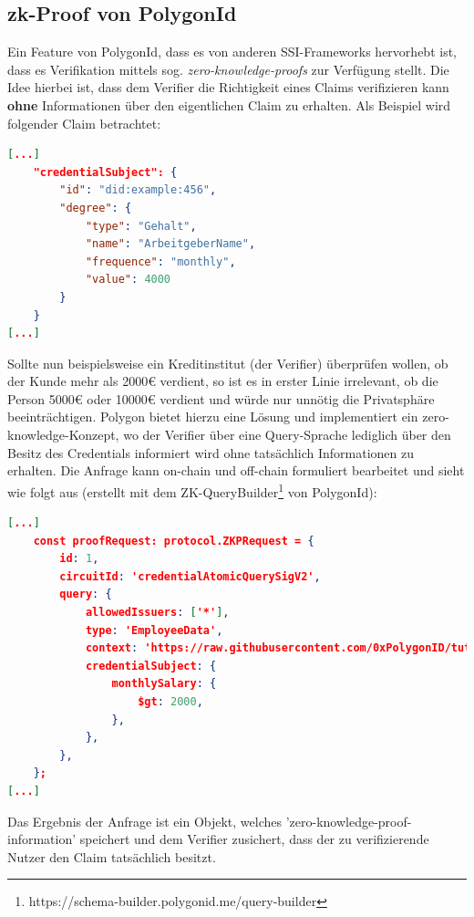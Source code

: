 \subsection{zk-Proof von PolygonId}
Ein Feature von PolygonId, dass es von anderen SSI-Frameworks hervorhebt ist, dass es Verifikation mittels sog. \textsl{zero-knowledge-proofs} zur Verfügung stellt. Die Idee hierbei ist, dass dem Verifier die Richtigkeit eines Claims verifizieren kann \textbf{ohne} Informationen über den eigentlichen Claim zu erhalten. Als Beispiel wird folgender Claim betrachtet:
\begin{lstlisting}[language=json,firstnumber=1]	
[...]
	"credentialSubject": {	
		"id": "did:example:456",	
		"degree": {		
			"type": "Gehalt",		
			"name": "ArbeitgeberName",		
			"frequence": "monthly",
			"value": 4000	
		}	
	}
[...]
\end{lstlisting}
Sollte nun beispielsweise ein Kreditinstitut (der Verifier) überprüfen wollen, ob der Kunde mehr als 2000€ verdient, so ist es in erster Linie irrelevant, ob die Person 5000€ oder 10000€ verdient und würde nur unnötig die Privatsphäre beeinträchtigen. Polygon bietet hierzu eine Lösung und implementiert ein zero-knowledge-Konzept, wo der Verifier über eine Query-Sprache lediglich über den Besitz des Credentials informiert wird ohne tatsächlich Informationen zu erhalten.
Die Anfrage kann on-chain und off-chain formuliert bearbeitet und sieht wie folgt aus (erstellt mit dem ZK-QueryBuilder\footnote{https://schema-builder.polygonid.me/query-builder} von PolygonId):

\begin{lstlisting}[language=json,firstnumber=1]	
[...]
    const proofRequest: protocol.ZKPRequest = {
		id: 1,
		circuitId: 'credentialAtomicQuerySigV2',
		query: {
			allowedIssuers: ['*'],
			type: 'EmployeeData',
			context: 'https://raw.githubusercontent.com/0xPolygonID/tutorial-examples/main/credential-schema/schemas-examples/employee-data/employee-data.jsonld',
			credentialSubject: {
				monthlySalary: {
					$gt: 2000,
				},
			},
		},
	};
[...]
\end{lstlisting}
Das Ergebnis der Anfrage ist ein Objekt, welches 'zero-knowledge-proof-information' speichert und dem Verifier zusichert, dass der zu verifizierende Nutzer den Claim tatsächlich besitzt.

